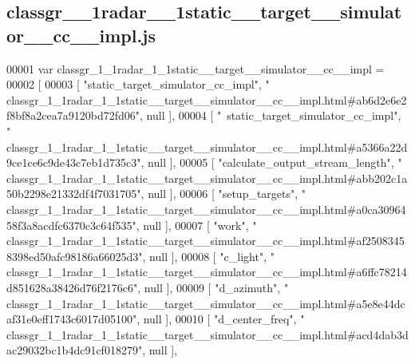 \subsection{classgr\+\_\+\_\+1radar\+\_\+\_\+1static\+\_\+\+\_\+target\+\_\+\+\_\+simulator\+\_\+\+\_\+cc\+\_\+\+\_\+impl.\+js}
\label{classgr__1__1radar__1__1static____target____simulator____cc____impl_8js_source}

\begin{DoxyCode}
00001 var classgr_1_1radar_1_1static__target__simulator__cc__impl =
00002 [
00003     [ \textcolor{stringliteral}{"static\_target\_simulator\_cc\_impl"}, \textcolor{stringliteral}{"
      classgr\_1\_1radar\_1\_1static\_\_target\_\_simulator\_\_cc\_\_impl.html#ab6d2e6e2f8bf8a2cea7a9120bd72fd06"}, null ],
00004     [ \textcolor{stringliteral}{"~static\_target\_simulator\_cc\_impl"}, \textcolor{stringliteral}{"
      classgr\_1\_1radar\_1\_1static\_\_target\_\_simulator\_\_cc\_\_impl.html#a5366a22d9ce1ce6c9de43c7eb1d735c3"}, null ],
00005     [ \textcolor{stringliteral}{"calculate\_output\_stream\_length"}, \textcolor{stringliteral}{"
      classgr\_1\_1radar\_1\_1static\_\_target\_\_simulator\_\_cc\_\_impl.html#abb202c1a50b2298e21332df4f7031705"}, null ],
00006     [ \textcolor{stringliteral}{"setup\_targets"}, \textcolor{stringliteral}{"
      classgr\_1\_1radar\_1\_1static\_\_target\_\_simulator\_\_cc\_\_impl.html#a0ca3096458f3a8acdfc6370c3c64f535"}, null ],
00007     [ \textcolor{stringliteral}{"work"}, \textcolor{stringliteral}{"
      classgr\_1\_1radar\_1\_1static\_\_target\_\_simulator\_\_cc\_\_impl.html#af25083458398ed50afc98186a66025d3"}, null ],
00008     [ \textcolor{stringliteral}{"c\_light"}, \textcolor{stringliteral}{"
      classgr\_1\_1radar\_1\_1static\_\_target\_\_simulator\_\_cc\_\_impl.html#a6ffc78214d851628a38426d76f2176c6"}, null ],
00009     [ \textcolor{stringliteral}{"d\_azimuth"}, \textcolor{stringliteral}{"
      classgr\_1\_1radar\_1\_1static\_\_target\_\_simulator\_\_cc\_\_impl.html#a5e8e44dcaf31e0eff1743c6017d05100"}, null ],
00010     [ \textcolor{stringliteral}{"d\_center\_freq"}, \textcolor{stringliteral}{"
      classgr\_1\_1radar\_1\_1static\_\_target\_\_simulator\_\_cc\_\_impl.html#acd4dab3dac29032bc1b4dc91cf018279"}, null ],

\end{DoxyCode}
